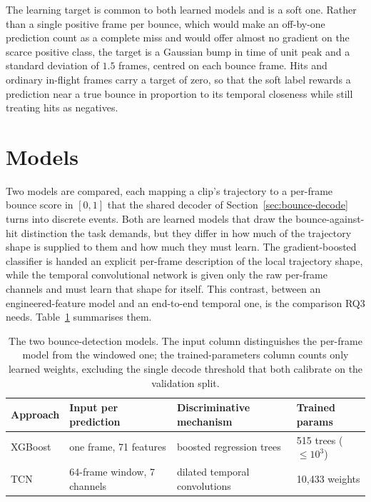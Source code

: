 The learning target is common to both learned models and is a soft one. Rather
than a single positive frame per bounce, which would make an off-by-one prediction
count as a complete miss and would offer almost no gradient on the scarce positive
class, the target is a Gaussian bump in time of unit peak and a standard deviation
of $1.5$ frames, centred on each bounce frame. Hits and ordinary in-flight frames
carry a target of zero, so that the soft label rewards a prediction near a true
bounce in proportion to its temporal closeness while still treating hits as
negatives.

\section{Models}
\label{sec:bounce-models}

Two models are compared, each mapping a clip's trajectory to a per-frame bounce
score in $[0, 1]$ that the shared decoder of Section~\ref{sec:bounce-decode} turns
into discrete events. Both are learned models that draw the bounce-against-hit
distinction the task demands, but they differ in how much of the trajectory shape
is supplied to them and how much they must learn. The gradient-boosted classifier
is handed an explicit per-frame description of the local trajectory shape, while
the temporal convolutional network is given only the raw per-frame channels and
must learn that shape for itself. This contrast, between an engineered-feature model
and an end-to-end temporal one, is the comparison RQ3 needs.
Table~\ref{tab:bounce-models} summarises them.

\begin{table}[t]
  \centering
  \small
  \setlength{\tabcolsep}{5pt}
  \caption{The two bounce-detection models. The input column distinguishes
    the per-frame model from the windowed one; the trained-parameters column
    counts only learned weights, excluding the single decode threshold that both
    calibrate on the validation split.}
  \label{tab:bounce-models}
  \begin{tabular}{@{}l p{3.0cm} p{3.1cm} l@{}}
    \toprule
    Approach & Input per prediction & Discriminative mechanism & Trained params \\
    \midrule
    XGBoost & one frame, 71 features & boosted regression trees & 515 trees ($\le\!10^3$) \\
    TCN & 64-frame window, 7 channels & dilated temporal convolutions & 10{,}433 weights \\
    \bottomrule
  \end{tabular}
\end{table}


